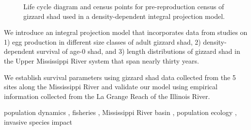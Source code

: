 \documentclass[preprint,review,12pt,authoryear]{elsarticle}
\providecommand{\DIFaddbegin}{} %
\providecommand{\DIFaddbeginFL}{} %
\providecommand{\DIFaddendFL}{} %
\begin{document}
\begin{frontmatter}
\begin{graphicalabstract}
\begin{figure}
\begin{center}
\DIFaddendFL %
\end{center}
\DIFaddbeginFL \captionsetup{labelformat=empty}
 \DIFaddendFL \caption{\small{Life cycle diagram and census points for pre-reproduction census of gizzard shad used in a density-dependent integral projection model.}}
\end{figure}

\end{graphicalabstract}

\begin{highlights}
\item We introduce an integral projection model that incorporates data from studies on 1) egg production in different size classes of adult gizzard shad, 2) density-dependent survival of age-0 shad, and 3) length distributions of gizzard shad in the Upper Mississippi River system that span nearly thirty years.
\item  We establish survival parameters using gizzard shad data collected from the 5 sites along the Mississippi River and validate our model using empirical information collected from the La Grange Reach of the Illinois River.
\end{highlights}

\begin{keyword}
  population dynamics \sep
  fisheries \sep
  Mississippi River basin \sep
  population ecology \sep
  invasive species impact 

\end{keyword}

\end{frontmatter}

\DIFaddbegin \addtocounter{figure}{-1}
\end{document}
